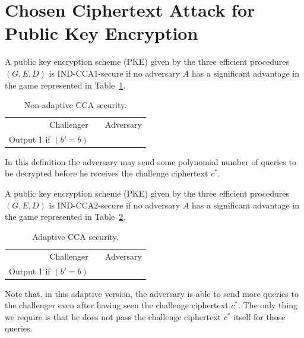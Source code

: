 \documentclass[12pt]{tufte-book}
\begin{document}
\section{Chosen Ciphertext Attack for Public Key Encryption}


\begin{definition}
A public key encryption scheme (PKE) given by the three efficient procedures $(G,E,D)$ is
IND-CCA1-secure if no adversary $A$ has a significant advantage in the game
represented in Table~\ref{tab:cca1}.
\begin{table}[ht]
\centering
\begin{tabular}{r c l}
Challenger & & Adversary \\
Output 1 if $(b'=b)$ & & \\
\end{tabular}
\caption{Non-adaptive CCA security.}\label{tab:cca1}
\end{table}

In this definition the adversary may send some polynomial number of queries
to be decrypted before he receives the challenge ciphertext $c^*$.
\end{definition}



\begin{definition}
A public key encryption scheme (PKE) given by the three efficient procedures $(G,E,D)$ is
IND-CCA2-secure if no adversary $A$ has a significant advantage in the game
represented in Table~\ref{tab:cca2}.
\begin{table}[t!]
\centering
\begin{tabular}{r c l}
Challenger & & Adversary \\
Output 1 if $(b'=b)$ & & \\
\end{tabular}
\caption{Adaptive CCA security.}\label{tab:cca2}
\end{table}

Note that, in this adaptive version, the adversary is able to send more queries to the
challenger even after having seen the challenge ciphertext $c^*$. The only thing we require
is that he does not pass the challenge ciphertext $c^*$ itself for those queries.
\end{definition}
\end{document}
